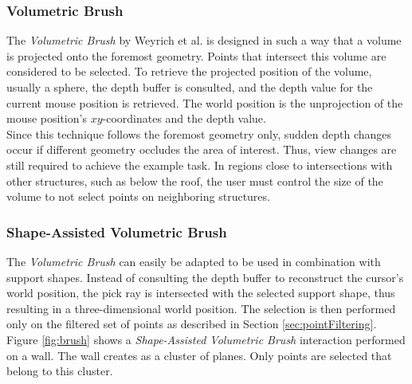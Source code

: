 \subsubsection{Volumetric Brush}

The \textit{Volumetric Brush} by Weyrich et al.\cite{weyrich2004post} is designed in such a way that a volume is projected onto the foremost geometry. Points that intersect this volume are considered to be selected. To retrieve the projected position of the volume, usually a sphere, the depth buffer is consulted, and the depth value for the current mouse position is retrieved. The world position is the unprojection of the mouse position's $xy$-coordinates and the depth value. 
\\
Since this technique follows the foremost geometry only, sudden depth changes occur if different geometry occludes the area of interest. Thus, view changes are still required to achieve the example task. In regions close to intersections with other structures, such as below the roof, the user must control the size of the volume to not select points on neighboring structures. 


\subsubsection{Shape-Assisted Volumetric Brush}

The \textit{Volumetric Brush} can easily be adapted to be used in combination with support shapes. Instead of consulting the depth buffer to reconstruct the cursor’s world position, the pick ray is intersected with the selected support shape, thus resulting in a three-dimensional world position. The selection is then performed only on the filtered set of points as described in Section \ref{sec:pointFiltering}. 
Figure \ref{fig:brush} shows a \textit{Shape-Assisted Volumetric Brush} interaction performed on a wall. The wall creates as a cluster of planes. Only points are selected that belong to this cluster. 

